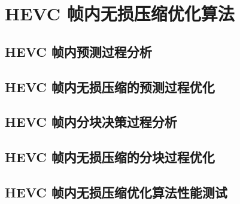 \chapter{HEVC 帧内无损压缩优化算法}
\label{cha:c3}

\section{HEVC 帧内预测过程分析}

\section{HEVC 帧内无损压缩的预测过程优化}

\section{HEVC 帧内分块决策过程分析}

\section{HEVC 帧内无损压缩的分块过程优化}

\section{HEVC 帧内无损压缩优化算法性能测试}